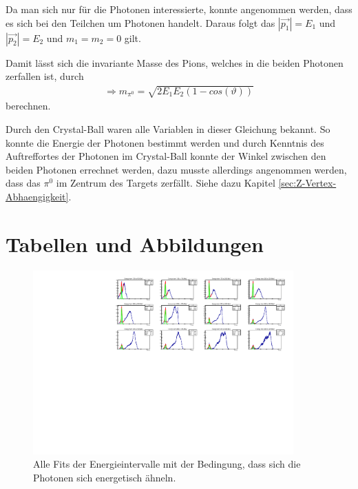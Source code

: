 \documentclass[a4paper,11pt,oneside,final,german,openbib,pdftex]{scrbook}
\begin{document}
{\begin{appendix}
Da man sich nur f\"ur die Photonen interessierte, konnte angenommen werden, dass es sich bei den Teilchen um Photonen handelt. Daraus folgt das $|\overrightarrow{p_1}|=E_1$ und $|\overrightarrow{p_2}|=E_2$ und $m_1=m_2=0$ gilt.

Damit lässt sich die invariante Masse des Pions, welches in die beiden Photonen zerfallen ist, durch
\begin{equation}
\begin{split}
\Rightarrow{m_{\pi^0}=\sqrt{2E_1E_2(1-cos(\vartheta))}}
\label{eq:Formel-zur-Berechnung-der-Invariante-Masse-Herleitung}
\end{split}
\end{equation}
berechnen.

Durch den Crystal-Ball waren alle Variablen in dieser Gleichung bekannt. So konnte die Energie der Photonen bestimmt werden und durch Kenntnis des Auftreffortes der Photonen im Crystal-Ball konnte der Winkel zwischen den beiden Photonen errechnet werden, dazu musste allerdings angenommen werden, dass das $\pi^0$ im Zentrum des Targets zerfällt. Siehe dazu Kapitel \ref{sec:Z-Vertex-Abhaengigkeit}.

\section{Tabellen und Abbildungen}


\begin{figure}[h!]
	\begin{center}
		\includegraphics[width=100mm]{RealDataEnergyIntervalSymmetricPhotonsAllFits}
		\caption{Alle Fits der Energieintervalle mit der Bedingung, dass sich die Photonen sich energetisch ähneln.}
		\label{fig:similarenergyallfits}
	\end{center}
\end{figure}


\end{appendix}}
\end{document}

